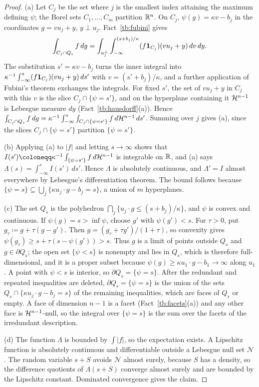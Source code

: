 \begin{proof}
(a) Let \(C_j\) be the set where \(j\) is the smallest index attaining the
maximum defining \(\psi\); the Borel sets \(C_1,\ldots,C_m\) partition
\(\mathbb R^n\). On \(C_j\), \(\psi(g)=\kappa v-b_j\) in the coordinates
\(g=v u_j+y\), \(y\perp u_j\). Fact~\ref{tb:fubini} gives
\[
 \int_{C_j\cap Q_s}f\,dg=\int_{u_j^\perp}\int_{-\infty}^{(s+b_j)/\kappa}
 (f\mathbf 1_{C_j})(v u_j+y)\,dv\,dy .
\]
The substitution \(s'=\kappa v-b_j\) turns the inner integral into
\(\kappa^{-1}\int_{-\infty}^s(f\mathbf 1_{C_j})(v u_j+y)\,ds'\) with
\(v=(s'+b_j)/\kappa\), and a further application of Fubini's theorem
exchanges the integrals. For fixed \(s'\), the set of \(v u_j+y\) in \(C_j\)
with this \(v\) is the slice \(C_j\cap\{\psi=s'\}\), and on the hyperplane
containing it \(\mathcal H^{n-1}\) is Lebesgue measure \(dy\)
(Fact~\ref{tb:hausdorff}(a)). Hence
\(\int_{C_j\cap Q_s}f\,dg=\kappa^{-1}\int_{-\infty}^s\int_{C_j\cap\{\psi=s'\}}
f\,d\mathcal H^{n-1}\,ds'\). Summing over \(j\) gives (a), since the slices
\(C_j\cap\{\psi=s'\}\) partition \(\{\psi=s'\}\).

(b) Applying (a) to \(|f|\) and letting \(s\to\infty\) shows that
\(I(s')\coloneqq \kappa^{-1}\int_{\{\psi=s'\}}f\,d\Haus^{n-1}\) is integrable on
\(\mathbb R\), and (a) says \(\Lambda(s)=\int_{-\infty}^sI(s')\,ds'\). Hence \(\Lambda\) is
absolutely continuous, and \(\Lambda'=I\) almost everywhere by Lebesgue's
differentiation theorem. The bound follows because
\(\{\psi=s\}\subseteq\bigcup_j\{\kappa u_j\cdot g-b_j=s\}\), a union of \(m\)
hyperplanes.

(c) The set \(Q_s\) is the polyhedron \(\bigcap_j\{u_j\cdot g\le(s+b_j)/\kappa\}\),
and \(\psi\) is convex and continuous. If \(\psi(g)=s>\inf\psi\), choose \(g'\)
with \(\psi(g')<s\). For \(\tau>0\), put \(g_\tau\coloneqq g+\tau(g-g')\).
Then \(g=(g_\tau+\tau g')/(1+\tau)\), so convexity gives
\(\psi(g_\tau)\ge s+\tau(s-\psi(g'))>s\). Thus \(g\) is a limit of points
outside \(Q_s\) and \(g\in\partial Q_s\); the open set \(\{\psi<s\}\) is
nonempty and lies in \(Q_s\), which is therefore full-dimensional, and it
is a proper subset because \(\psi(g)\ge\kappa u_1\cdot g-b_1\to\infty\) along
\(u_1\). A point with \(\psi<s\) is interior, so \(\partial Q_s=\{\psi=s\}\). After
the redundant and repeated inequalities are deleted, \(\partial Q_s=\{\psi=s\}\)
is the union of the sets \(Q_s\cap\{\kappa u_j\cdot g-b_j=s\}\) of the
remaining inequalities, which are faces of \(Q_s\) or empty. A face of
dimension \(n-1\) is a facet (Fact~\ref{tb:facets}(a)) and any other face is
\(\mathcal H^{n-1}\)-null, so the integral over \(\{\psi=s\}\) is the sum over the
facets of the irredundant description.

(d) The function \(\Lambda\) is bounded by \(\int|f|\), so the expectation
exists. A Lipschitz function is absolutely continuous and differentiable outside a
Lebesgue null set \(\mathcal N\). The random variable \(s+S\) avoids
\(\mathcal N\) almost surely, because \(S\) has a density, so the difference
quotients of \(\Lambda(s+S)\) converge almost surely and are bounded by the
Lipschitz constant. Dominated convergence gives the claim.
\end{proof}

